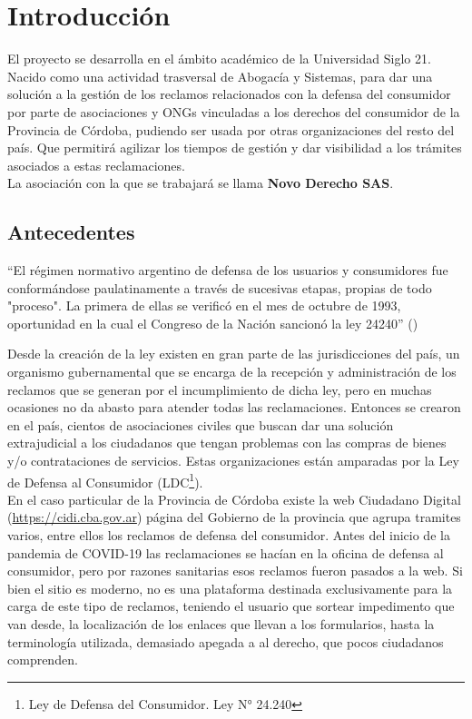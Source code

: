 
\section{Introducción} \label{sec: Intro}
	
	El proyecto se desarrolla en el ámbito académico de la Universidad Siglo 21. Nacido como una actividad trasversal de Abogacía y Sistemas, para dar una solución a la gestión de los reclamos relacionados con la defensa del consumidor por parte de asociaciones y ONGs vinculadas a los derechos del consumidor de la Provincia de Córdoba, pudiendo ser usada por otras organizaciones del resto del país. Que permitirá agilizar los tiempos de gestión y dar visibilidad a los trámites asociados a estas reclamaciones.\\
	
	La asociación con la que se trabajará se llama \textbf{Novo Derecho SAS}.
	
	\subsection{Antecedentes} \label{subsec: Antec}
		
		``El régimen normativo argentino de defensa de los usuarios y consumidores fue
		conformándose paulatinamente a través de sucesivas etapas, propias de todo "proceso". La primera de ellas se verificó en el mes de octubre de 1993, oportunidad en la cual el Congreso de la Nación sancionó la ley 24240'' (\cite{Hernandez2003})
			
		Desde la creación de la ley existen en gran parte de las jurisdicciones del país, un organismo gubernamental que se encarga de la recepción y administración de los reclamos que se generan por el incumplimiento de dicha ley, pero en muchas ocasiones no da abasto para atender todas las reclamaciones. Entonces se crearon en el país, cientos de asociaciones civiles que buscan dar una solución extrajudicial a los ciudadanos que tengan problemas con las compras de bienes y/o contrataciones de servicios. Estas organizaciones están amparadas por la Ley de Defensa al Consumidor (LDC\footnote{Ley de Defensa del Consumidor. Ley N° 24.240}).\\
		
		En el caso particular de la Provincia de Córdoba existe la web Ciudadano Digital (\url{https://cidi.cba.gov.ar}) página del Gobierno de la provincia que agrupa tramites varios, entre ellos los reclamos de defensa del consumidor. Antes del inicio de la pandemia de COVID-19 las reclamaciones se hacían en la oficina de defensa al consumidor, pero por razones sanitarias esos reclamos fueron pasados a la web. Si bien el sitio es moderno, no es una plataforma destinada exclusivamente para la carga de este tipo de reclamos, teniendo el usuario que sortear impedimento que van desde, la localización de los enlaces que llevan a los formularios, hasta la terminología utilizada, demasiado apegada a al derecho, que pocos ciudadanos comprenden. 
		
